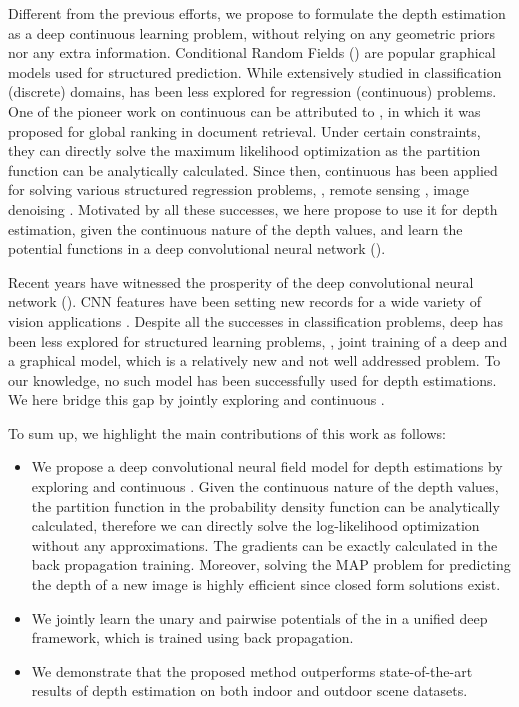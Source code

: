 Different from the previous efforts, we propose to  
formulate the depth estimation as a deep continuous \crf learning problem, without relying on any geometric priors nor any extra information. 
Conditional Random Fields (\crf) \cite{Lafferty_icml01} are popular graphical models used for structured prediction. While extensively studied in classification (discrete) domains, \crf has been less explored for regression (continuous) problems.  
One of the pioneer work on continuous \crf can be attributed to \cite{ccrf_nips08}, in which it was proposed for global ranking in document retrieval.
%
Under certain constraints, they can directly solve the maximum likelihood optimization as the partition function  can be analytically calculated.
%
%
%
Since then, continuous \crf has been applied for solving various structured regression problems, \eg, remote sensing \cite{ccrf_ecai10,ccrf_aaai13}, image denoising \cite{ccrf_aaai13}.
Motivated by all these successes, we here propose to use it for depth estimation,
given the continuous nature of the depth values, and learn the potential functions in a deep convolutional neural network (\cnn).



%
Recent years have witnessed the prosperity of the deep convolutional neural network (\cnn). 
CNN features have been setting new records for a wide variety of vision applications \cite{astound_cvprW14}.
%
%
%
%
Despite all the successes in classification problems, 
deep \cnn has been less explored for structured learning problems, \ie, joint training of a deep \cnn and a graphical model, which is a relatively new and not well addressed problem.
To our knowledge, no such model has been successfully used for depth estimations. 
We here bridge this gap by jointly exploring \cnn and continuous \crf.
%
%
%
%



%
%
%
%
%
%
%



To sum up, we highlight the main contributions of this work as follows:
\begin{itemize}
\vspace{-.12cm} \item
We propose a deep convolutional neural field model for depth estimations by exploring \cnn and continuous \crf.  
%
Given the continuous nature of the depth values, the partition function in the probability density function can be analytically calculated, therefore we can directly solve the log-likelihood optimization without any approximations.  The gradients can be exactly calculated in the back propagation training.
Moreover, solving the MAP problem for predicting the depth of a new image is highly efficient since closed form solutions exist.
%
\vspace{-.12cm} \item
We jointly learn the unary and pairwise potentials of the \crf in a unified deep \cnn framework, which is trained using back propagation.
%
%
\vspace{-.12cm} \item
We demonstrate that the proposed method outperforms state-of-the-art results of depth estimation on both indoor and outdoor scene datasets.
\end{itemize}